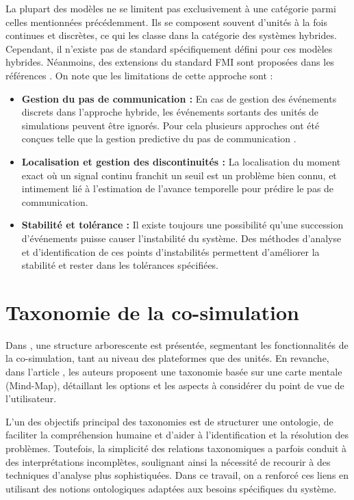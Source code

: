 La plupart des modèles ne se limitent pas exclusivement à une catégorie parmi celles mentionnées précédemment. Ils se composent souvent d'unités à la fois continues et discrètes, ce qui les classe dans la catégorie des systèmes hybrides. Cependant, il n'existe pas de standard spécifiquement défini pour ces modèles hybrides. Néanmoins, des extensions du standard FMI sont proposées dans les références \cite{b21,b22}.
\newpage 
On note que les limitations de cette approche sont : 
\begin{itemize}
  \item \textbf{Gestion du pas de communication :} En cas de gestion des événements discrets dans l'approche hybride, les événements sortants des unités de simulations peuvent être ignorés. Pour cela plusieurs approches ont été conçues telle que la gestion predictive du pas de communication \cite{b23}. 
  \item \textbf{Localisation et gestion des discontinuités :} La localisation du moment exact où un signal continu franchit un seuil est un problème bien connu, et intimement lié à l'estimation de l'avance temporelle pour prédire le pas de communication.
  \item \textbf{Stabilité et tolérance : } Il existe toujours une possibilité qu'une succession d'événements puisse causer l'instabilité du système. Des méthodes d'analyse et d'identification de ces points d'instabilités permettent d'améliorer la stabilité et rester dans les tolérances spécifiées.
\end{itemize}


\section{Taxonomie de la co-simulation}\label{sec:4}
Dans \cite{b7}, une structure arborescente est présentée, segmentant les fonctionnalités de la co-simulation, tant au niveau des plateformes que des unités. En revanche, dans l'article \cite{b24}, les auteurs proposent une taxonomie basée sur une carte mentale (Mind-Map), détaillant les options et les aspects à considérer du point de vue de l'utilisateur.

L'un des objectifs principal des taxonomies est de structurer une ontologie, de faciliter la compréhension humaine et d'aider à l’identification et la résolution des problèmes. Toutefois, la simplicité des relations taxonomiques a parfois conduit à des interprétations incomplètes, soulignant ainsi la nécessité de recourir à des techniques d'analyse plus sophistiquées. Dans ce travail, on a renforcé ces liens en utilisant des notions ontologiques \cite{b25} adaptées aux besoins spécifiques du système.

